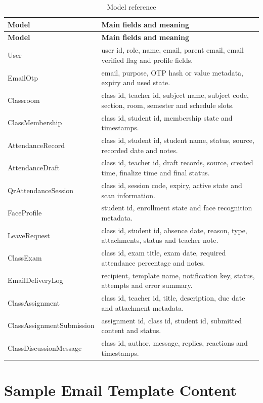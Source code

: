 \begin{longtable}{p{3.7cm} p{9.5cm}}
\caption{Model reference}
\label{tab:model-reference}\\
\toprule
\textbf{Model} & \textbf{Main fields and meaning}\\
\midrule
\endfirsthead
\toprule
\textbf{Model} & \textbf{Main fields and meaning}\\
\midrule
\endhead
User & user id, role, name, email, parent email, email verified flag and profile fields.\\
EmailOtp & email, purpose, OTP hash or value metadata, expiry and used state.\\
Classroom & class id, teacher id, subject name, subject code, section, room, semester and schedule slots.\\
ClassMembership & class id, student id, membership state and timestamps.\\
AttendanceRecord & class id, student id, student name, status, source, recorded date and notes.\\
AttendanceDraft & class id, teacher id, draft records, source, created time, finalize time and final status.\\
QrAttendanceSession & class id, session code, expiry, active state and scan information.\\
FaceProfile & student id, enrollment state and face recognition metadata.\\
LeaveRequest & class id, student id, absence date, reason, type, attachments, status and teacher note.\\
ClassExam & class id, exam title, exam date, required attendance percentage and notes.\\
EmailDeliveryLog & recipient, template name, notification key, status, attempts and error summary.\\
ClassAssignment & class id, teacher id, title, description, due date and attachment metadata.\\
ClassAssignmentSubmission & assignment id, class id, student id, submitted content and status.\\
ClassDiscussionMessage & class id, author, message, replies, reactions and timestamps.\\
\bottomrule
\end{longtable}

\section{Sample Email Template Content}

